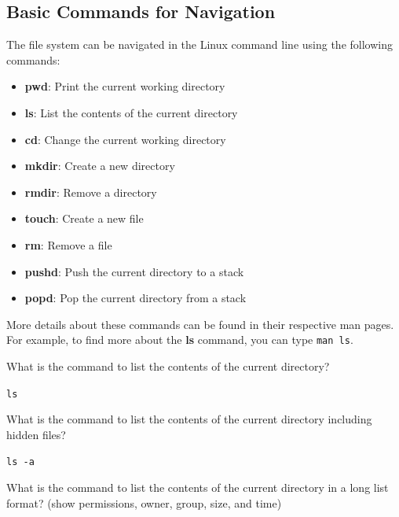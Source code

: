 \subsection{Basic Commands for Navigation}
The file system can be navigated in the Linux command line using the following commands:
\begin{itemize}
  \item \textbf{pwd}: Print the current working directory
  \item \textbf{ls}: List the contents of the current directory
  \item \textbf{cd}: Change the current working directory
  \item \textbf{mkdir}: Create a new directory
  \item \textbf{rmdir}: Remove a directory
  \item \textbf{touch}: Create a new file
  \item \textbf{rm}: Remove a file
  \item \textbf{pushd}: Push the current directory to a stack
  \item \textbf{popd}: Pop the current directory from a stack
\end{itemize}

More details about these commands can be found in their respective
man pages. For example, to find more about the \textbf{ls} command,
you can type \texttt{man ls}.

\begin{qs}
  What is the command to list the contents of the current directory?
\end{qs}

\begin{ans}
  \texttt{ls}
\end{ans}


\begin{qs}
  What is the command to list the contents of the current directory
  including hidden files?
\end{qs}

\begin{ans}
\texttt{ls -a}
\end{ans}

\begin{qs}
  What is the command to list the contents of the current directory
  in a long list format? (show permissions, owner, group, size, and time)
\end{qs}

